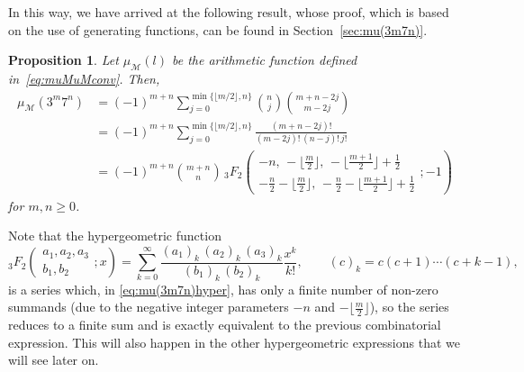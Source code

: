 \documentclass[11pt, a4paper]{article}
\newcommand{\calM}{\mathcal{M}}
\newcommand{\muM}{\mu_\calM}
\theoremstyle{plain}
\newtheorem{proposition}[theorem]{Proposition}
\theoremstyle{definition}
\begin{document}
In this way, we have arrived at the following result, whose proof, which is based on the use of generating functions, can be found in Section~\ref{sec:mu(3m7n)}.

\begin{proposition}
\label{prop:mu(3m7n)}
Let $\muM(l)$ be the arithmetic function defined in~\eqref{eq:muMuMconv}. 
Then, 
\begin{align}
\label{eq:mu(3m7n)previo}
  \muM(3^m7^n) &=
  (-1)^{m+n} \sum_{j=0}^{\min\{\lfloor m/2\rfloor, n\}} 
  \binom{n}{j} \binom{m+n-2j}{m-2j} \\
\label{eq:mu(3m7n)}
  &= (-1)^{m+n} \sum_{j=0}^{\min\{\lfloor m/2\rfloor, n\}} 
  \frac{(m+n-2j)!}{(m-2j)!\,(n-j)!\,j!} \\
\label{eq:mu(3m7n)hyper}
  &= (-1)^{m+n} \binom{m+n}{n}\,
  {}_3F_2 \! \left(\begin{matrix}
  -n,\, -\lfloor\tfrac{m}{2}\rfloor,\, -\lfloor\tfrac{m+1}{2}\rfloor + \tfrac{1}{2} \\[4pt]
  -\tfrac{n}{2} - \lfloor\tfrac{m}{2}\rfloor,\, -\tfrac{n}{2} - \lfloor\tfrac{m+1}{2}\rfloor + \tfrac{1}{2}
  \end{matrix}; -1 \right)
\end{align}
for $m,n\ge0$. 
\end{proposition}

Note that the hypergeometric function
\begin{equation}
\label{eq:3F2}
  {}_3F_2 \! \left(\begin{matrix}
  a_1, a_2, a_3 \\[4pt]
  b_1, b_2
  \end{matrix}; x \right) 
  = \sum_{k=0}^{\infty} \frac{{(a_1)}_k\, {(a_2)}_k\, {(a_3)}_k}{{(b_1)}_k\,{(b_2)}_k} \frac{x^k}{k!},
  \qquad (c)_k = c(c+1) \cdots (c+k-1),
\end{equation}
is a series which, in \eqref{eq:mu(3m7n)hyper}, has only a finite number of non-zero summands (due to the negative integer parameters $-n$ and $-\lfloor\tfrac{m}{2}\rfloor$), so the series reduces to a finite sum and is exactly equivalent to the previous combinatorial expression. 
This will also happen in the other hypergeometric expressions that we will see later on.
\end{document}
